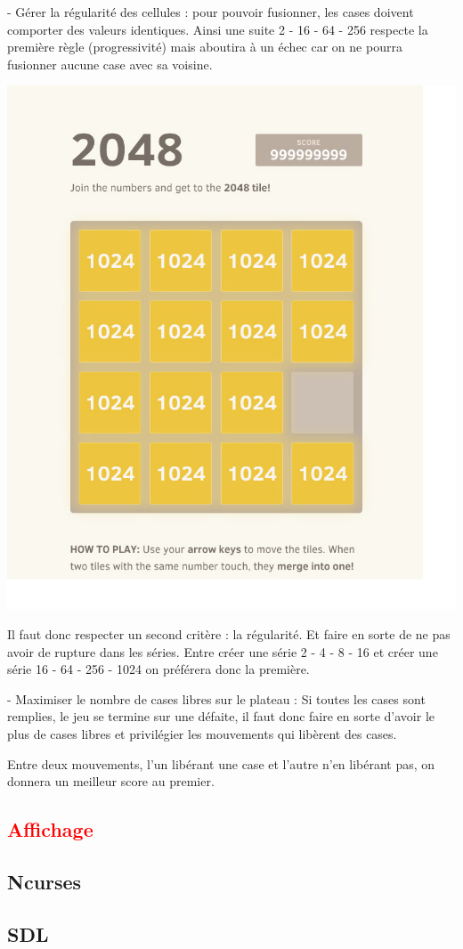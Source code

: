 \documentclass{article}
\begin{document}
- Gérer la régularité des cellules : pour pouvoir fusionner, les cases doivent comporter des valeurs identiques. Ainsi une suite 2 - 16 - 64 - 256 respecte la première règle (progressivité) mais aboutira à un échec car on ne pourra fusionner aucune case avec sa voisine.

\includegraphics[scale=0.2]{../image.png}

Il faut donc respecter un second critère : la régularité. Et faire en sorte de ne pas avoir de rupture dans les séries. Entre créer une série 2 - 4 - 8 - 16 et créer une série 16 - 64 - 256 - 1024 on préférera donc la première.

- Maximiser le nombre de cases libres sur le plateau : Si toutes les cases sont remplies, le jeu se termine sur une défaite, il faut donc faire en sorte d'avoir le plus de cases libres et privilégier les mouvements qui libèrent des cases.

Entre deux mouvements, l'un libérant une case et l'autre n'en libérant pas, on donnera un meilleur score au premier.

\textcolor{red}{\section{Affichage}}

\subsection{Ncurses}

\subsection{SDL}
\end{document}
